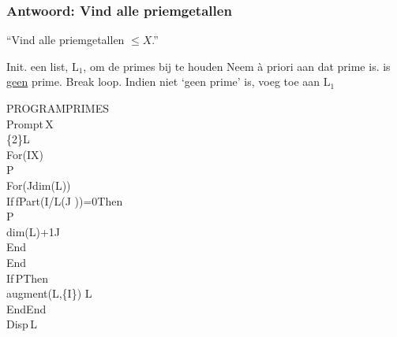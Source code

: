 \begin{frame}
\frametitle{Antwoord: Vind alle priemgetallen }

\vspace{-0.5cm}
\hspace{-1cm}
\begin{minipage}{0.83\textwidth}
	\begin{algorithm}[H]
	\caption{``Vind alle priemgetallen $\le X$.''}
	\begin{algorithmic}[1]
	  \State Init. een list, $\mathrm{L}_1$, om de primes bij te houden
	    \State Neem \`a priori aan dat  prime is.
	        \State {} is \underline{geen} prime. Break loop.
	      \EndIf
	    \EndFor
	    \State Indien  niet `geen prime' is, voeg toe aan $\mathrm{L}_1$
	  \EndFor
	\EndFunction
	\end{algorithmic}
	\end{algorithm}
\end{minipage}
\begin{minipage}{0.15\textwidth}%
\begin{ticalc}
	PROGRAM\:PRIMES\\%
	\:Prompt\,X\\%
	\:\{2\}\>L\\%
	\:For(I\comma X)\\%
	\>P\\%
	\:For(J\comma dim(L))\\%
	\:If\,fPart(I/L(J ))=0\:Then\\%
	\>P\\%
	\:dim(L)+1\>J\\%
	\:End\\%
	\:End\\%
	\:If\,P\:Then\\%
	\:augment(L,\{I\}) \>L\\%
	\:End\:End\\%
	\:Disp\,L
\end{ticalc}
\end{minipage}

\end{frame}



